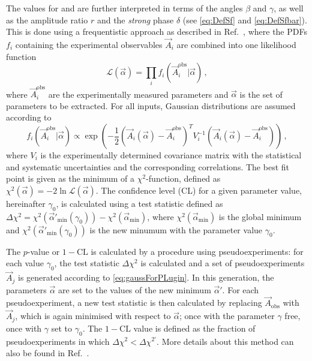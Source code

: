 The values for \Sf and \Sfbar are further interpreted in terms of the angles $\beta$ and $\gamma$, as well as the amplitude ratio $r$ and the \emph{strong} phase $\delta$ (see \cref{eq:DefSf} and \eqref{eq:DefSfbar}).
This is done using a frequentistic approach as described in Ref.~\cite{Aaij:2016kjh}, where the PDFs $f_i$ containing the experimental observables $\vec{A}_i$ are combined into one likelihood function
\begin{equation}
\mathcal{L}(\vec{\alpha})=\prod_i f_i\left(\vec{A}_i^{\text{obs}}\big|\vec{\alpha}\right)\,,
\end{equation}
where $\vec{A}_i^{\text{obs}}$ are the experimentally measured parameters and $\vec{\alpha}$ is the set of parameters to be extracted.
For all inputs, Gaussian distributions are assumed according to
\begin{equation}
f_i\left(\vec{A}_i^{\text{obs}}\big|\vec{\alpha}\right)\propto\exp\!\left(-\frac{1}{2}\left(\vec{A}_i(\vec{\alpha})-\vec{A}_i^{\text{obs}}\right)^T V_i^{-1}\left(\vec{A}_i(\vec{\alpha})-\vec{A}_i^{\text{obs}}\right)\right)\,,\label{eq:gaussForPLugin}
\end{equation}
where $V_i$ is the experimentally determined covariance matrix with the statistical and systematic uncertainties and the corresponding correlations.
The best fit point is given as the minimum of a $\chi^2$-function, defined as $\chi^2(\vec{\alpha})=-2\ln\mathcal{L}(\vec{\alpha})$.
The confidence level (CL) for a given parameter value, hereinafter $\gamma_0$, is calculated using a test statistic defined as $\Delta\chi^2=\chi^2(\vec{\alpha}'_{\text{min}}(\gamma_0))-\chi^2(\vec{\alpha}_{\text{min}})$, where $\chi^2(\vec{\alpha}_{\text{min}})$ is the global minimum and $\chi^2(\vec{\alpha}'_{\text{min}}(\gamma_0))$ is the new minumum with the parameter value $\gamma_0$.

The $p$-value or $1-\text{CL}$ is calculated by a procedure using pseudoexperiments:
for each value $\gamma_0$, the test statistic $\Delta\chi^2$ is calculated and a set of pseudoexperiments $\vec{A}_j$ is generated according to \cref{eq:gaussForPLugin}.
In this generation, the parameters $\vec{\alpha}$ are set to the values of the new minimum $\vec{\alpha}'$.
For each pseudoexperiment, a new test statistic is then calculated by replacing $\vec{A}_{\text{obs}}$ with $\vec{A}_j$, which is again minimised with respect to $\vec{\alpha}$; once with the parameter $\gamma$ free, once with $\gamma$ set to $\gamma_0$.
The $1-\text{CL}$ value is defined as the fraction of pseudoexperiments in which $\Delta\chi^2<\Delta\chi^{2'}$.
More details about this method can also be found in Ref.~\cite{Bodhisattva:2009uba}.

